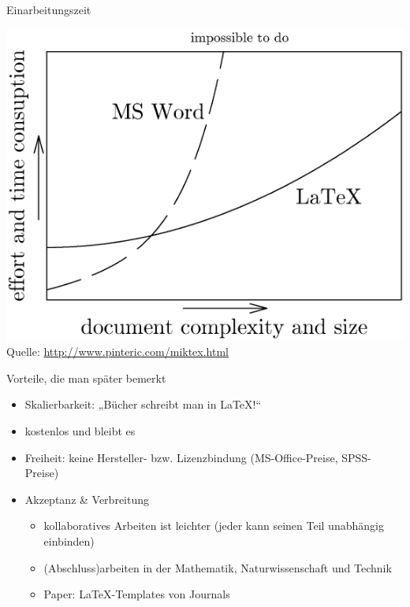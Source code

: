 \begin{frame}{Einarbeitungszeit}

\includegraphics[width=\textwidth*0.8,height=\textheight*0.8,keepaspectratio]{../../img/miktex.png} Quelle:
\url{http://www.pinteric.com/miktex.html}

\end{frame}

\begin{frame}{Vorteile, die man später bemerkt}

\begin{itemize}
\itemsep1pt\parskip0pt
\item
  Skalierbarkeit: „Bücher schreibt man in \LaTeX!``
\item
  kostenlos und bleibt es
\item
  Freiheit: keine Hersteller- bzw. Lizenzbindung (MS-Office-Preise,
  SPSS-Preise)
\item
  Akzeptanz \& Verbreitung

  \begin{itemize}
  \itemsep1pt\parskip0pt
  \item
    kollaboratives Arbeiten ist leichter (jeder kann seinen Teil
    unabhängig einbinden)
  \item
    (Abschluss)arbeiten in der Mathematik, Naturwissenschaft und Technik
  \item
    Paper: \LaTeX-Templates von Journals
  \end{itemize}
\end{itemize}

\end{frame}

